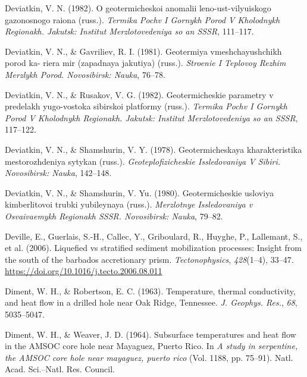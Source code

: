 \documentclass[draft,linenumbers]{agujournal2018}
\begin{document}
\leavevmode{}%
Deviatkin, V. N. (1982). O geotermicheskoi anomalii leno-ust-vilyuiskogo
gazonosnogo raiona (russ.). \emph{Termika Pochv I Gornykh Porod V
Kholodnykh Regionakh. Jakutsk: Institut Merzlotovedeniya so an SSSR},
111--117.

\leavevmode{}%
Deviatkin, V. N., \& Gavriliev, R. I. (1981). Geotermiya
vmeshchayushchikh porod ka- riera mir (zapadnaya jakutiya) (russ.).
\emph{Stroenie I Teplovoy Rezhim Merzlykh Porod. Novosibirsk: Nauka},
76--78.

\leavevmode{}%
Deviatkin, V. N., \& Rusakov, V. G. (1982). Geotermicheskie parametry v
predelakh yugo-vostoka sibirskoi platformy (russ.). \emph{Termika Pochv
I Gornykh Porod V Kholodnykh Regionakh. Jakutsk: Institut
Merzlotovedeniya so an SSSR}, 117--122.

\leavevmode{}%
Deviatkin, V. N., \& Shamshurin, V. Y. (1978). Geotermicheskaya
kharakteristika mestorozhdeniya sytykan (russ.).
\emph{Geoteplofizicheskie Issledovaniya V Sibiri. Novosibirsk: Nauka},
142--148.

\leavevmode{}%
Deviatkin, V. N., \& Shamshurin, V. Yu. (1980). Geotermicheskie usloviya
kimberlitovoi trubki yubileynaya (russ.). \emph{Merzlotnye Issledovaniya
v Osvaivaemykh Regionakh SSSR. Novosibirsk: Nauka}, 79--82.

\leavevmode{}%
Deville, E., Guerlais, S.-H., Callec, Y., Griboulard, R., Huyghe, P.,
Lallemant, S., et al. (2006). Liquefied vs stratified sediment
mobilization processes: Insight from the south of the barbados
accretionary prism. \emph{Tectonophysics}, \emph{428}(1--4), 33--47.
\url{https://doi.org/10.1016/j.tecto.2006.08.011}

\leavevmode{}%
Diment, W. H., \& Robertson, E. C. (1963). Temperature, thermal
conductivity, and heat flow in a drilled hole near {Oak Ridge,
Tennessee}. \emph{J. Geophys. Res.}, \emph{68}, 5035--5047.

\leavevmode{}%
Diment, W. H., \& Weaver, J. D. (1964). Subsurface temperatures and heat
flow in the {AMSOC} core hole near {Mayaguez, Puerto Rico}. In \emph{A
study in serpentine, the AMSOC core hole near mayaguez, puerto rico}
(Vol. 1188, pp. 75--91). Natl. Acad. Sci.--Natl. Res. Council.
\end{document}
